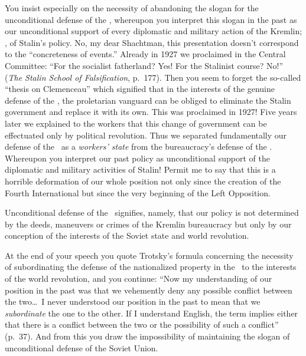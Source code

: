 You insist especially on the necessity of abandoning the slogan for the unconditional defense of the \USSR, whereupon you interpret this slogan in the past as our unconditional support of every diplomatic and military action of the Kremlin; \ie, of Stalin’s policy. No, my dear Shachtman, this presentation doesn’t correspond to the “concreteness of events.” Already in 1927 we proclaimed in the Central Committee: “For the socialist fatherland? Yes! For the Stalinist course? No!” (\emph{The Stalin School of Falsification}, p.~177). Then you seem to forget the so-called “thesis on Clemenceau” which signified that in the interests of the genuine defense of the \USSR, the proletarian vanguard can be obliged to eliminate the Stalin government and replace it with its own. This was proclaimed in 1927! Five years later we explained to the workers that this change of government can be effectuated only by political revolution. Thus we separated fundamentally our defense of the \USSR\ as a \emph{workers’ state} from the bureaucracy’s defense of the \USSR. Whereupon you interpret our past policy as unconditional support of the diplomatic and military activities of Stalin! Permit me to say that this is a horrible deformation of our whole position not only since the creation of the Fourth International but since the very beginning of the Left Opposition.

Unconditional defense of the \USSR\ signifies, namely, that our policy is not determined by the deeds, maneuvers or crimes of the Kremlin bureaucracy but only by our conception of the interests of the Soviet state and world revolution.

At the end of your speech you quote Trotsky’s formula concerning the necessity of subordinating the defense of the nationalized property in the \USSR\ to the interests of the world revolution, and you continue: “Now my understanding of our position in the past was that we vehemently deny any possible conflict between the two\dots\ I never understood our position in the past to mean that we \emph{subordinate} the one to the other. If I understand English, the term implies either that there is a conflict between the two or the possibility of such a conflict” (p.~37). And from this you draw the impossibility of maintaining the slogan of unconditional defense of the Soviet Union.


